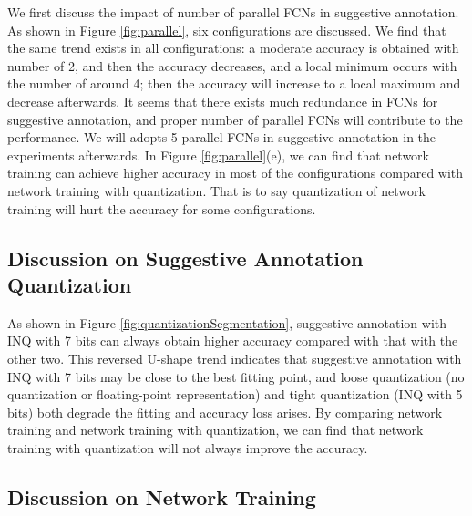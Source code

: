 \documentclass[10pt,twocolumn,letterpaper]{article}
\begin{document}
We first discuss the impact of number of parallel FCNs in suggestive annotation.
As shown in Figure \ref{fig:parallel}, six configurations are discussed.
We find that the same trend exists in all configurations: a moderate accuracy is obtained with number of 2, and then the accuracy decreases, and a local minimum occurs with the number of around 4; then the accuracy will increase to a local maximum and decrease afterwards.
It seems that there exists much redundance in FCNs for suggestive annotation, and proper number of parallel FCNs will contribute to the performance.
We will adopts 5 parallel FCNs in suggestive annotation in the experiments afterwards.
In Figure \ref{fig:parallel}(e), we can find that network training can achieve higher accuracy in most of the configurations compared with network training with quantization.
That is to say quantization of network training will hurt the accuracy for some configurations.


\vspace{6pt}
\subsection{Discussion on Suggestive Annotation Quantization}

As shown in Figure \ref{fig:quantizationSegmentation}, suggestive annotation with INQ with 7 bits can always obtain higher accuracy compared with that with the other two.
This reversed U-shape trend indicates that suggestive annotation with INQ with 7 bits may be close to the best fitting point, and loose quantization (no quantization or floating-point representation) and tight quantization (INQ with 5 bits) both degrade the fitting and accuracy loss arises.
By comparing network training and network training with quantization, we can find that network training with quantization will not always improve the accuracy.


\vspace{6pt}
\subsection{Discussion on Network Training}
\end{document}
